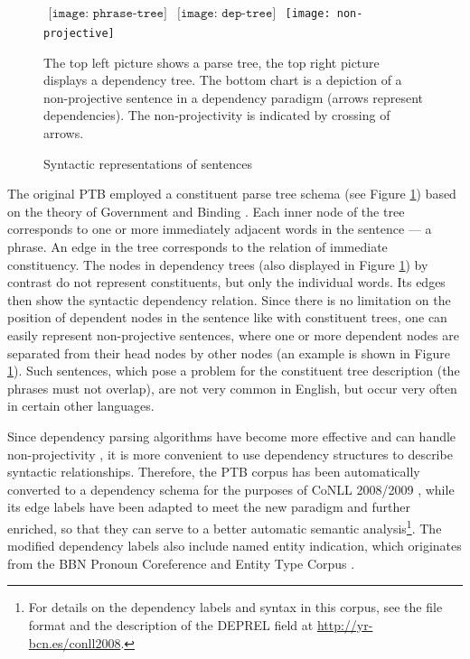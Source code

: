 \documentclass[12pt,notitlepage]{report}
\begin{document}
\begin{figure}[htb]\footnotesize
\caption{Syntactic representations of sentences}\label{fig:trees}
\begin{center}
$\begin{array}{cc}
\texttt{[image: phrase-tree]} & \texttt{[image: dep-tree]}
\end{array}$
\texttt{[image: non-projective]}
\end{center}
The top left picture shows a parse tree, the top right picture displays a dependency tree. The bottom chart is a depiction of a non-projective sentence in a dependency paradigm (arrows represent dependencies). The non-projectivity is indicated by crossing of arrows.
\end{figure}

The original PTB employed a constituent parse tree schema (see Figure \ref{fig:trees}) based on the theory of Government and Binding \citep{chomsky81}. Each inner node of the tree corresponds to one or more immediately adjacent words in the sentence --- a phrase. An edge in the tree corresponds to the relation of immediate constituency. The nodes in dependency trees (also displayed in Figure \ref{fig:trees}) by contrast do not represent constituents, but only the individual words. Its edges then show the syntactic dependency relation. Since there is no limitation on the position of dependent nodes in the sentence like with constituent trees, one can easily represent non-projective sentences, where one or more dependent nodes are separated from their head nodes by other nodes (an example is shown in Figure \ref{fig:trees}). Such sentences, which pose a problem for the constituent tree description (the phrases must not overlap), are not very common in English, but occur very often in certain other languages.

Since dependency parsing algorithms have become more effective and can handle non-projectivity \citep[cf.][]{mcdonald05}, it is more convenient to use dependency structures to describe syntactic relationships. Therefore, the PTB corpus has been automatically converted to a dependency schema for the purposes of CoNLL 2008/2009 \citep{johansson07,surdeanu08}, while its edge labels have been adapted to meet the new paradigm and further enriched, so that they can serve to a better automatic semantic analysis\footnote{For details on the dependency labels and syntax in this corpus, see the file format and the description of the DEPREL field at \url{http://yr-bcn.es/conll2008}.}. The modified dependency labels also include named entity indication, which originates from the BBN Pronoun Coreference and Entity Type Corpus \citep{weischedel05}.
\end{document}
